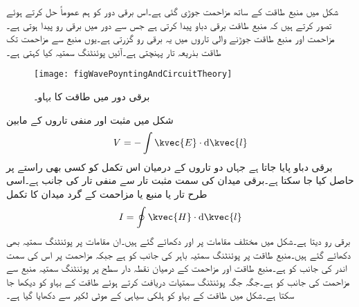 
شکل  میں منبع طاقت کے ساتھ مزاحمت  جوڑی گئی ہے۔اس برقی دور کو ہم عموماً حل کرتے ہوئے تصور کرتے ہیں کہ منبع طاقت برقی دباو  پیدا کرتی ہے جس سے  دور میں برقی رو  پیدا ہوتی ہے۔مزاحمت اور منبع طاقت جوڑنے والی تاروں میں یہ برقی رو گزرتی ہے۔یوں منبع سے مزاحمت تک  طاقت بذریعہ تار پہنچتی ہے۔آئیں پوئنٹنگ سمتیہ کیا کہتی ہے۔
\begin{figure}
\centering
\texttt{[image: figWavePoyntingAndCircuitTheory]}
\caption{برقی دور میں طاقت کا بہاو۔}
\label{شکل_مستوی_برقی_دور_طاقت_بہاو}
\end{figure}

شکل  میں مثبت اور منفی تاروں کے مابین
\begin{align}
V=-\int \kvec{E} \cdot \dif \kvec{l}
\end{align}
برقی دباو پایا جاتا ہے جہاں دو تاروں کے درمیان اس تکمل کو کسی بھی راستے پر حاصل کیا جا سکتا ہے۔برقی میدان  کی سمت مثبت تار سے منفی تار کی  جانب ہے۔اسی طرح تار یا منبع یا مزاحمت کے گرد میدان کا تکمل
\begin{align}
I=\oint \kvec{H} \cdot \dif \kvec{l}
\end{align}
برقی رو دیتا ہے۔شکل میں مختلف مقامات پر  اور  دکھائے گئے ہیں۔ان مقامات پر پوئنٹنگ سمتیہ  بھی دکھائے گئے ہیں۔منبع طاقت پر پوئنٹنگ سمتیہ باہر کی جانب کو ہے جبکہ مزاحمت پر اس کی سمت اندر کی جانب کو ہے۔منبع طاقت اور مزاحمت کے درمیان نقطہ دار سطح پر پوئنٹنگ سمتیہ منبع سے مزاحمت کی جانب کو ہے۔جگہ جگہ پوئنٹنگ سمتیات دریافت کرتے ہوئے طاقت کے بہاو کو دیکھا جا سکتا ہے۔شکل میں طاقت کے بہاو کو ہلکی سیاہی کے موٹی لکیر سے دکھایا گیا ہے۔

